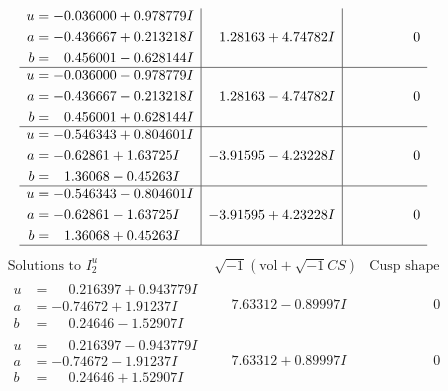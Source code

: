 \documentclass[1p]{elsarticle_modified}
\theoremstyle{definition}
\newcommand{\I}{\sqrt{-1}}
\begin{document}
$$\begin{array}{c|c|c}
\begin{aligned}
u &= -0.036000 + 0.978779 I \\
a &= -0.436667 + 0.213218 I \\
b &= \phantom{-}0.456001 - 0.628144 I\end{aligned}
 & \phantom{-}1.28163 + 4.74782 I & \phantom{-0.000000 } 0 \\ \hline\begin{aligned}
u &= -0.036000 - 0.978779 I \\
a &= -0.436667 - 0.213218 I \\
b &= \phantom{-}0.456001 + 0.628144 I\end{aligned}
 & \phantom{-}1.28163 - 4.74782 I & \phantom{-0.000000 } 0 \\ \hline\begin{aligned}
u &= -0.546343 + 0.804601 I \\
a &= -0.62861 + 1.63725 I \\
b &= \phantom{-}1.36068 - 0.45263 I\end{aligned}
 & -3.91595 - 4.23228 I & \phantom{-0.000000 } 0 \\ \hline\begin{aligned}
u &= -0.546343 - 0.804601 I \\
a &= -0.62861 - 1.63725 I \\
b &= \phantom{-}1.36068 + 0.45263 I\end{aligned}
 & -3.91595 + 4.23228 I & \phantom{-0.000000 } 0\\
 \hline 
 \end{array}$$\newpage$$\begin{array}{c|c|c}  
\text{Solutions to }I^u_{2}& \I (\text{vol} + \sqrt{-1}CS) & \text{Cusp shape}\\
 \hline 
\begin{aligned}
u &= \phantom{-}0.216397 + 0.943779 I \\
a &= -0.74672 + 1.91237 I \\
b &= \phantom{-}0.24646 - 1.52907 I\end{aligned}
 & \phantom{-}7.63312 - 0.89997 I & \phantom{-0.000000 } 0 \\ \hline\begin{aligned}
u &= \phantom{-}0.216397 - 0.943779 I \\
a &= -0.74672 - 1.91237 I \\
b &= \phantom{-}0.24646 + 1.52907 I\end{aligned}
 & \phantom{-}7.63312 + 0.89997 I & \phantom{-0.000000 } 0 \\ \hline\begin{aligned}

\end{aligned}
\end{array}$$
\end{document}
